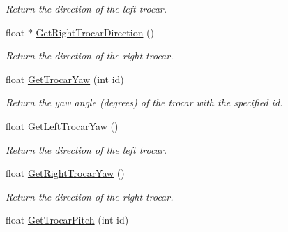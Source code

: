 \begin{DoxyCompactItemize}
\begin{DoxyCompactList}\small\item\em Return the direction of the left trocar. \item\end{DoxyCompactList}\item 
\hypertarget{classvtkIHP_a0d57160939eabba73f965da837e8be46}{
float $\ast$ \hyperlink{classvtkIHP_a0d57160939eabba73f965da837e8be46}{GetRightTrocarDirection} ()}
\label{classvtkIHP_a0d57160939eabba73f965da837e8be46}

\begin{DoxyCompactList}\small\item\em Return the direction of the right trocar. \item\end{DoxyCompactList}\item 
\hypertarget{classvtkIHP_a677d8fcd2bcc5f8a29826029a29d9831}{
float \hyperlink{classvtkIHP_a677d8fcd2bcc5f8a29826029a29d9831}{GetTrocarYaw} (int id)}
\label{classvtkIHP_a677d8fcd2bcc5f8a29826029a29d9831}

\begin{DoxyCompactList}\small\item\em Return the yaw angle (degrees) of the trocar with the specified id. \item\end{DoxyCompactList}\item 
\hypertarget{classvtkIHP_a0078f1a93a92ede95b5baed689cbeebb}{
float \hyperlink{classvtkIHP_a0078f1a93a92ede95b5baed689cbeebb}{GetLeftTrocarYaw} ()}
\label{classvtkIHP_a0078f1a93a92ede95b5baed689cbeebb}

\begin{DoxyCompactList}\small\item\em Return the direction of the left trocar. \item\end{DoxyCompactList}\item 
\hypertarget{classvtkIHP_aeb35510cfc98036b126b9491e67589ac}{
float \hyperlink{classvtkIHP_aeb35510cfc98036b126b9491e67589ac}{GetRightTrocarYaw} ()}
\label{classvtkIHP_aeb35510cfc98036b126b9491e67589ac}

\begin{DoxyCompactList}\small\item\em Return the direction of the right trocar. \item\end{DoxyCompactList}\item 
\hypertarget{classvtkIHP_a186c478c7dc653e3a99ab1573c4e44b0}{
float \hyperlink{classvtkIHP_a186c478c7dc653e3a99ab1573c4e44b0}{GetTrocarPitch} (int id)}
\label{classvtkIHP_a186c478c7dc653e3a99ab1573c4e44b0}


\end{DoxyCompactItemize}
